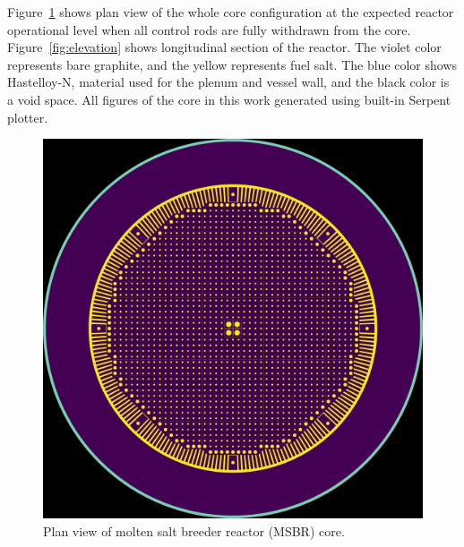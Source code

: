 \documentclass{anstrans}
\begin{document}
Figure~\ref{fig:plan} shows plan view of the whole core configuration at the expected reactor operational level when all control rods are fully withdrawn from the core.  Figure~\ref{fig:elevation} shows longitudinal section of the reactor. The violet color represents bare graphite, and the yellow represents fuel salt. The blue color shows Hastelloy-N, material used for the plenum and vessel wall, and the black color is a void space. All figures of the core in this work generated using built-in Serpent plotter.
\begin{figure}[ht] %
  \centering
  \includegraphics[width=\linewidth]{figure_2_1.png}
  \caption{Plan view of molten salt breeder reactor (MSBR) core.}
  \label{fig:plan}
\end{figure}
\end{document}
